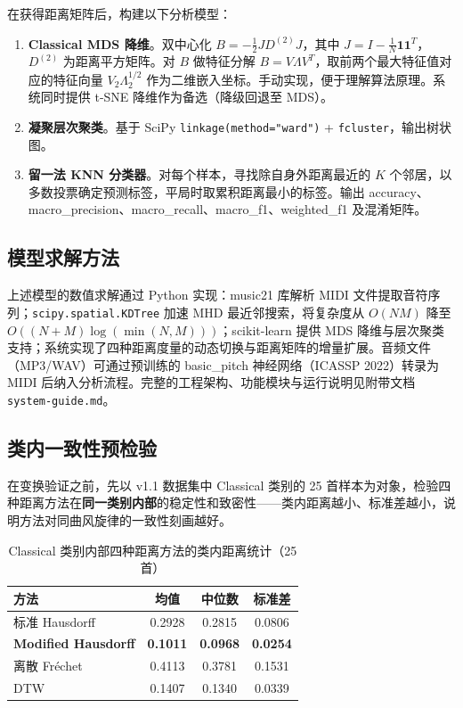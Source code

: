\documentclass[withoutpreface]{cumcmthesis}
\begin{document}
在获得距离矩阵后，构建以下分析模型：

\begin{enumerate}[label=(\arabic*),leftmargin=2em]
    \item \textbf{Classical MDS 降维}。双中心化 $B = -\frac{1}{2}JD^{(2)}J$，其中 $J = I - \frac{1}{N}\mathbf{1}\mathbf{1}^T$，$D^{(2)}$ 为距离平方矩阵。对 $B$ 做特征分解 $B = V\Lambda V^T$，取前两个最大特征值对应的特征向量 $V_2\Lambda_2^{1/2}$ 作为二维嵌入坐标。手动实现，便于理解算法原理。系统同时提供 t-SNE 降维作为备选（降级回退至 MDS）。
    \item \textbf{凝聚层次聚类}。基于 SciPy \texttt{linkage(method="ward")} + \texttt{fcluster}，输出树状图。
    \item \textbf{留一法 KNN 分类器}。对每个样本，寻找除自身外距离最近的 $K$ 个邻居，以多数投票确定预测标签，平局时取累积距离最小的标签。输出 accuracy、macro\_precision、macro\_recall、macro\_f1、weighted\_f1 及混淆矩阵。
\end{enumerate}

\subsection{模型求解方法}

上述模型的数值求解通过 Python 实现：music21 库解析 MIDI 文件提取音符序列；\texttt{scipy.spatial.KDTree} 加速 MHD 最近邻搜索，将复杂度从 $O(NM)$ 降至 $O((N+M)\log(\min(N,M)))$；scikit-learn 提供 MDS 降维与层次聚类支持；系统实现了四种距离度量的动态切换与距离矩阵的增量扩展。音频文件（MP3/WAV）可通过预训练的 basic\_pitch 神经网络（ICASSP 2022）转录为 MIDI 后纳入分析流程。完整的工程架构、功能模块与运行说明见附带文档 \texttt{system-guide.md}。

\subsection{类内一致性预检验}

在变换验证之前，先以 v1.1 数据集中 Classical 类别的 25 首样本为对象，检验四种距离方法在\textbf{同一类别内部}的稳定性和致密性——类内距离越小、标准差越小，说明方法对同曲风旋律的一致性刻画越好。

\begin{table}[htbp]
    \centering
    \caption{Classical 类别内部四种距离方法的类内距离统计（25 首）}
    \label{tab:classical_internal}
    \begin{tabular}{lccc}
        \toprule
        \textbf{方法} & \textbf{均值} & \textbf{中位数} & \textbf{标准差} \\
        \midrule
        标准 Hausdorff & 0.2928 & 0.2815 & 0.0806 \\
        \textbf{Modified Hausdorff} & \textbf{0.1011} & \textbf{0.0968} & \textbf{0.0254} \\
        离散 Fr\'{e}chet & 0.4113 & 0.3781 & 0.1531 \\
        DTW & 0.1407 & 0.1340 & 0.0339 \\
        \bottomrule
    \end{tabular}
\end{table}
\end{document}
